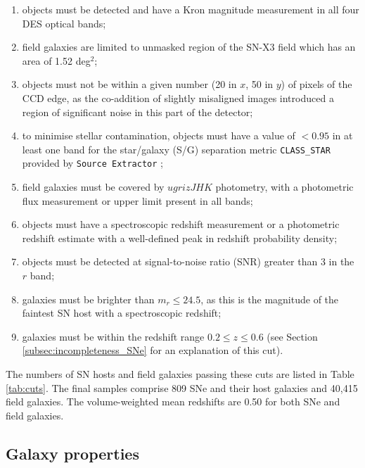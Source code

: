 \documentclass[fleqn,usenatbib]{mnras}
\begin{document}
\begin{enumerate}
    \item objects must be detected and have a Kron magnitude measurement in all four DES optical bands;
    
    \item field galaxies are limited to unmasked region of the SN-X3 field \citep{Hartley2020} which has an area of 1.52 deg$^2$;
    
    \item objects must not be within a given number (20 in $x$, 50 in $y$) of pixels of the CCD edge, as the co-addition of slightly misaligned images introduced a region of significant noise in this part of the detector;
    
    \item to minimise stellar contamination, objects must have a value of $<0.95$ in at least one band for the star/galaxy (S/G) separation metric \texttt{CLASS\_STAR} provided by \texttt{Source Extractor} \citep{Bertin1996};
    
    \item field galaxies must be covered by $ugrizJHK$ photometry, with a photometric flux measurement or upper limit present in all bands;
    
    \item objects must have a spectroscopic redshift measurement or a photometric redshift estimate with a well-defined peak in redshift  probability density;
    
    \item objects must be detected at signal-to-noise ratio (SNR) greater than 3 in the $r$ band;
    
    \item galaxies must be brighter than $m_r \leq 24.5$, as this is the magnitude of the faintest SN host with a spectroscopic redshift;
    
    \item galaxies must be within the redshift range $0.2 \leq z \leq 0.6$ (see Section \ref{subsec:incompleteness_SNe} for an explanation of this cut).
\end{enumerate}

The numbers of SN hosts and field galaxies passing these cuts are listed in Table \ref{tab:cuts}. The final samples comprise 809 SNe and their host galaxies and 40,415 field galaxies. The volume-weighted mean redshifts are 0.50 for both SNe and field galaxies.

\subsection{Galaxy properties \label{subsec:properties}}
\end{document}
